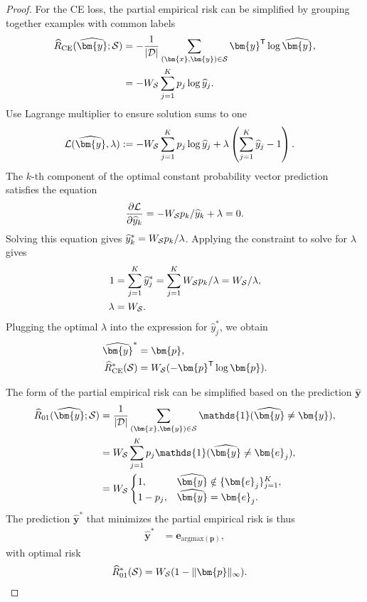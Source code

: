 \documentclass[letterpaper]{article} %
\newcommand{\bx}{{\bm{x}}}
\newcommand{\bp}{{\bm{p}}}
\newcommand{\by}{{\bm{y}}}
\newcommand{\be}{{\bm{e}}}
\newcommand{\T}{{\mathsf{T}}}
\newcommand{\I}{\mathds{1}}
\newcommand{\cS}{{\cal{S}}}
\newcommand{\cD}{{\cal{D}}}
\newcommand{\WS}{{W_{\cal{S}}}}
\newcommand{\argmax}{\mathrm{argmax}}
\begin{document}
\begin{proof}
    \medskip{} 
    For the CE loss, the partial empirical risk can be simplified by grouping together examples with common labels
    \begin{align*}
        \widehat{R}_{\mathrm{CE}}(\widehat{\by};\cS) &=  -\frac{1}{|\cD|}\sum_{(\bx,\by)\in\cS} \by^\T \log \widehat{\by},
        \\
        &= -W_{\cS} \sum_{j=1}^K p_j\log \widehat{y}_j.
    \end{align*}
    Use Lagrange multiplier to ensure solution sums to one
    \begin{align*}
        \mathcal{L}(\widehat{\by},\lambda) &:= -W_{\cS} \sum_{j=1}^K p_j\log \widehat{y}_j + \lambda \left( \sum_{j=1}^K \widehat{y}_j - 1 \right).
    \end{align*}
    The $k$-th component of the optimal constant probability vector prediction satisfies the equation
    \begin{align*}
        \frac{\partial\mathcal{L}}{\partial\widehat{y}_k} = -W_{\cS}  p_k/\widehat{y}_k + \lambda=0.
    \end{align*}
    Solving this equation gives $\widehat{y}_k^* = \WS p_k/\lambda$. Applying the constraint to solve for $\lambda$ gives
    \begin{align*}
        1 &= \sum_{j=1}^K \widehat{y}_j^* = \sum_{j=1}^K \WS p_k/\lambda = \WS/\lambda,
        \\
        \lambda &= \WS.
    \end{align*}
    Plugging the optimal $\lambda$ into the expression for $\widehat{y}_j^*$, we obtain
    \begin{align*}
        \widehat{\by}^* &= \bp,
        \\
        \widehat{R}_{\mathrm{CE}}^*(\cS) &= \WS(-\bp^\T\log \bp).
    \end{align*}



    \medskip{} 
    The form of the partial empirical risk can be simplified based on the prediction $\widehat{\by}$
    \begin{align*}
        \widehat{R}_{01}(\widehat{\by};\cS) &= \frac{1}{|\cD|}\sum_{(\bx,\by)\in\cS}  \I(\widehat{\by}\ne\by),
        \\
        &= \WS \sum_{j=1}^K p_j \I(\widehat{\by}\ne \be_j),
        \\
        &= \WS\begin{cases}
            1,& \widehat{\by} \notin \{\be_j\}_{j=1}^K, \\
            1-p_j,& \widehat{\by}=\be_j.
        \end{cases}  
    \end{align*}
    The prediction $\widehat{\by}^*$ that minimizes the partial empirical risk is thus   
    \begin{align*}
        \widehat{\by}^* &= \bm{e}_{\argmax(\bp)},
    \end{align*}
    with optimal risk
    \begin{align*}
        \widehat{R}_{01}^*(\cS) &= \WS(1-\|\bp\|_\infty).
    \end{align*}



\end{proof}
\end{document}

